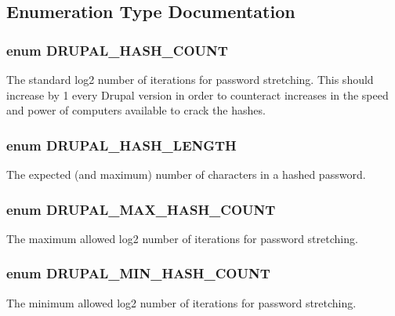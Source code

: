 \subsection{Enumeration Type Documentation}
\hypertarget{password_8inc_a6779dd88da34773d5f1b68cd3176fd2f}{
\subsubsection[{DRUPAL\_\-HASH\_\-COUNT}]{\setlength{\rightskip}{0pt plus 5cm}enum {\bf DRUPAL\_\-HASH\_\-COUNT}}}
\label{password_8inc_a6779dd88da34773d5f1b68cd3176fd2f}
The standard log2 number of iterations for password stretching. This should increase by 1 every Drupal version in order to counteract increases in the speed and power of computers available to crack the hashes. \hypertarget{password_8inc_aeb9d94dcc991ed40a124d8ff153d2782}{
\subsubsection[{DRUPAL\_\-HASH\_\-LENGTH}]{\setlength{\rightskip}{0pt plus 5cm}enum {\bf DRUPAL\_\-HASH\_\-LENGTH}}}
\label{password_8inc_aeb9d94dcc991ed40a124d8ff153d2782}
The expected (and maximum) number of characters in a hashed password. \hypertarget{password_8inc_aa0eb61e6083023579b85b387475b529f}{
\subsubsection[{DRUPAL\_\-MAX\_\-HASH\_\-COUNT}]{\setlength{\rightskip}{0pt plus 5cm}enum {\bf DRUPAL\_\-MAX\_\-HASH\_\-COUNT}}}
\label{password_8inc_aa0eb61e6083023579b85b387475b529f}
The maximum allowed log2 number of iterations for password stretching. \hypertarget{password_8inc_ab26271966114a05b9ccb6287c4848309}{
\subsubsection[{DRUPAL\_\-MIN\_\-HASH\_\-COUNT}]{\setlength{\rightskip}{0pt plus 5cm}enum {\bf DRUPAL\_\-MIN\_\-HASH\_\-COUNT}}}
\label{password_8inc_ab26271966114a05b9ccb6287c4848309}
The minimum allowed log2 number of iterations for password stretching. 

